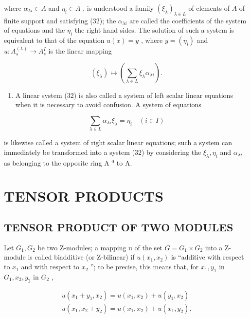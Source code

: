 where \(\alpha_{\lambda i} \in A\) and \(\eta_i \in A\) , is understood a family \((\xi_\lambda)_{\lambda \in L}\) of elements of \(A\) of finite support and satisfying (32); the \(\alpha_{\lambda i}\) are called the coefficients of the system of equations and the \(\eta_i\) the right hand sides. The solution of such a system is equivalent to that of the equation \(u(x) = y\) , where \(y = (\eta_i)\) and \(u: A_s^{(L)} \to A_s^I\) is the linear mapping

\[
\left(\xi_ {\lambda}\right) \mapsto \left(\sum_ {\lambda \in L} \xi_ {\lambda} \alpha_ {\lambda i}\right).
\]

\begin{enumerate}
\def\labelenumi{(\arabic{enumi})}
\setcounter{enumi}{3}
\tightlist
\item
  A linear system (32) is also called a system of left scalar linear equations when it is necessary to avoid confusion. A system of equations
\end{enumerate}

\[
\sum_ {\lambda \in L} \alpha_ {\lambda i} \xi_ {\lambda} = \eta_ {i} \quad (i \in I)\tag{33}
\]

is likewise called a system of right scalar linear equations; such a system can immediately be transformed into a system (32) by considering the \(\xi_{\lambda}, \eta_{i}\) and \(\alpha_{\lambda i}\) as belonging to the opposite ring A \(^{0}\) to A.

\section{TENSOR PRODUCTS}

\subsection{TENSOR PRODUCT OF TWO MODULES}

Let \(G_{1}, G_{2}\) be two Z-modules; a mapping u of the set \(G = G_{1} \times G_{2}\) into a Z-module is called biadditive (or Z-bilinear) if \(u(x_{1}, x_{2})\) is ``additive with respect to \(x_{1}\) and with respect to \(x_{2}\) ''; to be precise, this means that, for \(x_{1}, y_{1}\) in \(G_{1}, x_{2}, y_{2}\) in \(G_{2}\) ,

\[
\begin{array}{l} u (x _ {1} + y _ {1}, x _ {2}) = u (x _ {1}, x _ {2}) + u (y _ {1}, x _ {2}) \\ u (x _ {1}, x _ {2} + y _ {2}) = u (x _ {1}, x _ {2}) + u (x _ {1}, y _ {2}). \end{array}
\]

